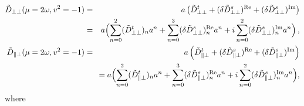 \documentclass[12pt]{article}
\numberwithin{equation}{section}
\newcommand{\1}[1]{\mathbf{1}^{#1}}
\newcommand{\2}[1]{\mathbf{2}^{#1}}
\newcommand{\3}[1]{\mathbf{3}^{#1}}
\newcommand{\4}[1]{\mathbf{4}^{#1}}
\newcommand{\5}[1]{\mathbf{5}^{#1}}
\newlength{\blength}
\newcommand{\fbrk}{\nnb & \\ & \hspace{\blength} }
\newcommand{\mlabel}[1]{ \text{\footnotesize \hspace{3mm}\fbox{\fbox{$#1$}} \label{#1}}}
\renewcommand{\mlabel}[1]{\label{#1}}
\newcommand{\nnb}{\nonumber}
\newcommand{\om}{\omega}
\newcommand{\vv}{v^2}
\newcommand{\TT}{{\perp\perp}}
\newcommand{\PT}{{\parallel\perp}}
\begin{document}
\begin{eqnarray}
\tilde{D}_\TT(\mu = 2 \om, \vv =-1) &=&   a \left(\tilde{D}^t_\TT + 
(\delta \tilde{D}^s_\TT)^{\text{Re}} + (\delta \tilde{D}^s_\TT)^{\text{Im}}
\right)
\nonumber\\
&=& a\Bigl( \sum_{n=0}^2 (\tilde{D}^t_\TT)_n a^n + \sum_{n=0}^3 (\delta \tilde{D}^s_\TT)^{\text{Re}}_n  a^n
+ i \sum_{n=0}^2 (\delta \tilde{D}^s_\TT)^{\text{Im}}_n a^n\Bigr)\,, 
\nonumber\\
\tilde{D}_\PT(\mu = 2 \om, \vv =-1) &=&   a  \left(\tilde{D}^t_\PT + 
(\delta \tilde{D}^s_\PT)^{\text{Re}} + (\delta \tilde{D}^s_\PT)^{\text{Im}}
\right)
\nonumber\\
&& \hspace{-1cm} = a\Bigl(\sum_{n=0}^2 (\tilde{D}^t_\PT)_n a^n + \sum_{n=0}^3 (\delta \tilde{D}^s_\PT)^{\text{Re}}_n  a^n
+ i \sum_{n=0}^2 (\delta \tilde{D}^s_\PT)^{\text{Im}}_n a^n\Bigr), 
\end{eqnarray}
where
%
\end{document}
